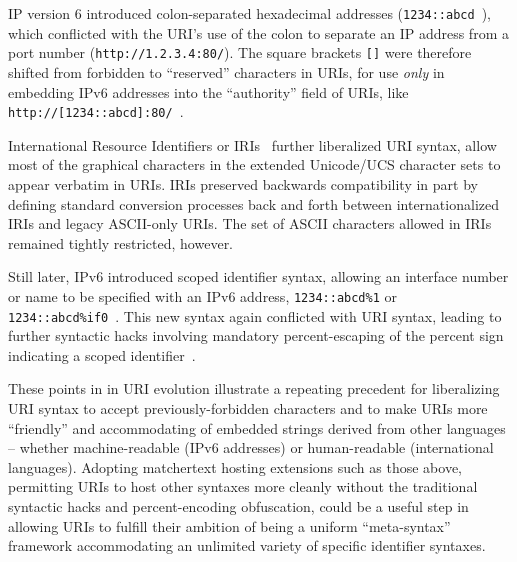 IP version 6 introduced colon-separated hexadecimal addresses
(\eg \verb|1234::abcd|~\cite{rfc2373}),
which conflicted with the URI's use of the colon to separate
an IP address from a port number (\eg \verb|http://1.2.3.4:80/|).
The square brackets \verb|[]| were therefore shifted
from forbidden to ``reserved'' characters in URIs,
for use \emph{only} in embedding IPv6 addresses
into the ``authority'' field of URIs,
like \verb|http://[1234::abcd]:80/|~\cite{rfc2732}.

International Resource Identifiers or IRIs~\cite{rfc3987}
further liberalized URI syntax,
allow most of the graphical characters
in the extended Unicode/UCS character sets to appear verbatim in URIs.
IRIs preserved backwards compatibility
in part by defining standard conversion processes back and forth
between internationalized IRIs and legacy ASCII-only URIs.
The set of ASCII characters allowed in IRIs remained tightly restricted,
however.

Still later, IPv6 introduced scoped identifier syntax,
allowing an interface number or name to be specified with an IPv6 address,
\eg \verb|1234::abcd%1| or \verb|1234::abcd%if0|~\cite{rfc4007}.
This new syntax again conflicted with URI syntax,
leading to further syntactic hacks involving
mandatory percent-escaping of the percent sign
indicating a scoped identifier~\cite{rfc6874}.

These points in in URI evolution illustrate
a repeating precedent for liberalizing URI syntax
to accept previously-forbidden characters
and to make URIs more ``friendly'' and accommodating
of embedded strings derived from other languages --
whether machine-readable (\eg IPv6 addresses)
or human-readable (international languages).
Adopting matchertext hosting extensions such as those above,
permitting URIs to host other syntaxes more cleanly
without the traditional  syntactic hacks and percent-encoding obfuscation,
could be a useful step in allowing URIs to fulfill their ambition
of being a uniform ``meta-syntax'' framework
accommodating an unlimited variety of specific identifier syntaxes.


